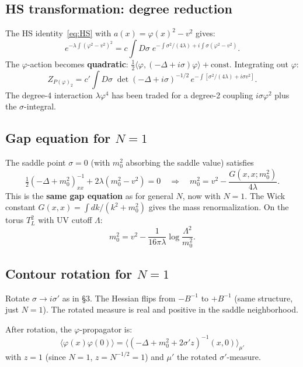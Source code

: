 \documentclass[12pt]{article}
\theoremstyle{definition}
\theoremstyle{remark}
\newcommand{\ph}{\varphi}
\begin{document}
\subsection{HS transformation: degree reduction}

The HS identity~\eqref{eq:HS} with $a(x) = \ph(x)^2 - v^2$ gives:
\begin{equation}
  e^{-\lambda\int(\ph^2-v^2)^2}
    = c\!\int\!D\sigma\;e^{-\int\sigma^2/(4\lambda)
      + i\int\sigma(\ph^2-v^2)}.
\end{equation}
The $\ph$-action becomes \textbf{quadratic}:
$\tfrac{1}{2}\langle\ph,(-\Delta+i\sigma)\ph\rangle + \text{const}$.
Integrating out $\ph$:
\begin{equation}
\label{eq:N1partition}
  Z_{P(\ph)_2} = c'\!\int\!D\sigma\;
    \det(-\Delta+i\sigma)^{-1/2}\,
    e^{-\int[\sigma^2/(4\lambda)+i\sigma v^2]}.
\end{equation}
The degree-4 interaction $\lambda\ph^4$ has been traded for a
degree-2 coupling $i\sigma\ph^2$ plus the $\sigma$-integral.

\subsection{Gap equation for $N = 1$}

The saddle point $\sigma = 0$ (with $m_0^2$ absorbing the saddle
value) satisfies
\begin{equation}
  \tfrac{1}{2}(-\Delta+m_0^2)^{-1}_{xx} + 2\lambda(m_0^2-v^2) = 0
  \quad\Longrightarrow\quad
  m_0^2 = v^2 - \frac{G(x,x;m_0^2)}{4\lambda}.
\end{equation}
This is the \textbf{same gap equation} as for general $N$, now with
$N=1$. The Wick constant $G(x,x) = \int dk/(k^2+m_0^2)$ gives the
mass renormalization. On the torus $T^2_L$ with UV cutoff $\Lambda$:
\begin{equation}
  m_0^2 = v^2 - \frac{1}{16\pi\lambda}\log\frac{\Lambda^2}{m_0^2}.
\end{equation}

\subsection{Contour rotation for $N = 1$}

Rotate $\sigma \to i\sigma'$ as in \S3. The Hessian flips from
$-B^{-1}$ to $+B^{-1}$ (same structure, just $N=1$). The rotated
measure is real and positive in the saddle neighborhood.

After rotation, the $\ph$-propagator is:
\begin{equation}
  \langle\ph(x)\ph(0)\rangle
    = \bigl\langle(-\Delta+m_0^2+2\sigma'z)^{-1}(x,0)
      \bigr\rangle_{\mu'}
\end{equation}
with $z = 1$ (since $N=1$, $z = N^{-1/2} = 1$) and $\mu'$ the
rotated $\sigma'$-measure.
\end{document}

